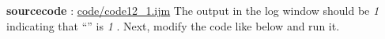 \textbf{sourcecode} : \href{http://www.example.com/contents}{code/code12\_1.ijm}
The output in the log window should be \textit{1} indicating that ``'' is \textit{1} . Next, modify the code like below and run it.